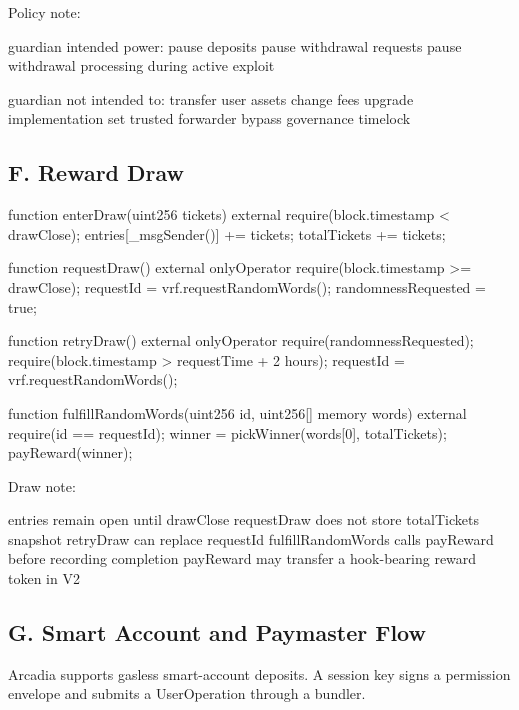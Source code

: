 Policy note:

\begin{codeblock}
guardian intended power:
    pause deposits
    pause withdrawal requests
    pause withdrawal processing during active exploit

guardian not intended to:
    transfer user assets
    change fees
    upgrade implementation
    set trusted forwarder
    bypass governance timelock
\end{codeblock}

\subsection*{F. Reward Draw}

\begin{codeblock}
function enterDraw(uint256 tickets) external {
    require(block.timestamp < drawClose);
    entries[_msgSender()] += tickets;
    totalTickets += tickets;
}

function requestDraw() external onlyOperator {
    require(block.timestamp >= drawClose);
    requestId = vrf.requestRandomWords();
    randomnessRequested = true;
}

function retryDraw() external onlyOperator {
    require(randomnessRequested);
    require(block.timestamp > requestTime + 2 hours);
    requestId = vrf.requestRandomWords();
}

function fulfillRandomWords(uint256 id, uint256[] memory words) external {
    require(id == requestId);
    winner = pickWinner(words[0], totalTickets);
    payReward(winner);
}
\end{codeblock}

Draw note:

\begin{codeblock}
entries remain open until drawClose
requestDraw does not store totalTickets snapshot
retryDraw can replace requestId
fulfillRandomWords calls payReward before recording completion
payReward may transfer a hook-bearing reward token in V2
\end{codeblock}

\subsection*{G. Smart Account and Paymaster Flow}

Arcadia supports gasless smart-account deposits. A session key signs a permission envelope and submits a UserOperation through a bundler.


